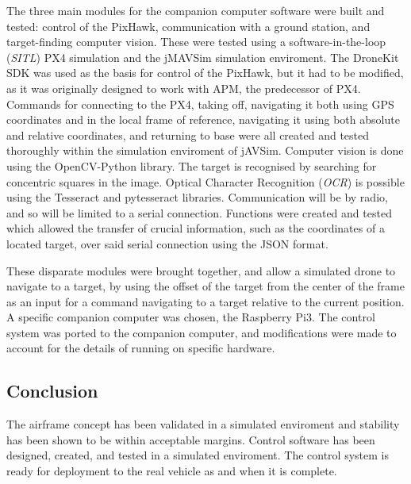\documentclass[11pt]{article}
\begin{document}
The three main modules for the companion computer software were built and tested: control of the PixHawk, communication with a ground station, and target-finding computer vision.
These were tested using a software-in-the-loop (\emph{SITL}) PX4 simulation and the jMAVSim simulation enviroment. The DroneKit SDK was used as the basis for control of the PixHawk, but it had to be modified, as it was originally designed to work with APM, the predecessor of PX4\cite{dronekit}. Commands for connecting to the PX4, taking off, navigating it both using GPS coordinates and in the local frame of reference, navigating it using both absolute and relative coordinates, and returning to base were all created and tested thoroughly within the simulation enviroment of jAVSim. Computer vision is done using the OpenCV-Python library. The target is recognised by searching for concentric squares in the image. Optical Character Recognition (\emph{OCR}) is possible using the Tesseract and pytesseract libraries. Communication will be by radio, and so will be limited to a serial connection. Functions were created and tested which allowed the transfer of crucial information, such as the coordinates of a located target, over said serial connection using the JSON format.

These disparate modules were brought together, and allow a simulated drone to navigate to a target, by using the offset of the target from the center of the frame as an input for a command navigating to a target relative to the current position. A specific companion computer was chosen, the Raspberry Pi3. The control system was ported to the companion computer, and modifications were made to account for the details of running on specific hardware.

\subsection*{Conclusion}
The airframe concept has been validated in a simulated enviroment and stability has been shown to be within acceptable margins. Control software has been designed, created, and tested in a simulated enviroment. The control system is ready for deployment to the real vehicle as and when it is complete.
\end{document}
